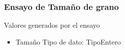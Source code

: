 \documentclass{article}
\begin{document}
\subsubsection{Ensayo de Tamaño de grano }
\par Valores generados por el ensayo
\begin{itemize}
	\item{Tamaño}
		\subitem Tipo de dato: \gls{TipoEntero}
\end{itemize}

\newpage
\printglossaries


%
%
\end{document}
